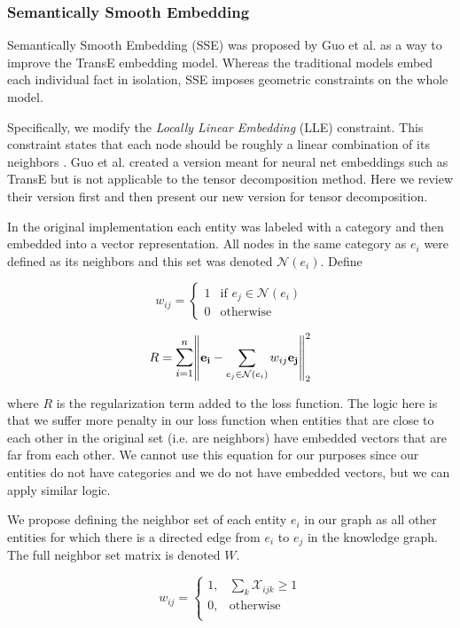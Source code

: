 \documentclass[pageno]{final_paper}
\begin{document}
\subsubsection{Semantically Smooth Embedding}
\label{Semantically Smooth Embedding}

Semantically Smooth Embedding (SSE) was proposed by Guo et al. \cite{Guo2015} as
a way to improve the TransE \cite{Bordes2013} embedding model. Whereas the
traditional models embed each individual fact in isolation, SSE imposes
geometric constraints on the whole model.

Specifically, we modify the \textit{Locally Linear Embedding} (LLE) constraint.
This constraint states that each node should be roughly a linear combination of
its neighbors \cite{Roweis2000}. Guo et al. \cite{Guo2015} created a version
meant for neural net embeddings such as TransE but is not applicable to the
tensor decomposition method. Here we review their version first and then present
our new version for tensor decomposition.

In the original implementation each entity was labeled with a category and
then embedded into a vector representation. All nodes in the same category as
$e_i$ were defined as its neighbors and this set was denoted $\mathcal{N}(e_i)$.
Define

$$
w_{ij} =
\begin{cases}
    1 & \text{if } e_j \in \mathcal{N}(e_i) \\
    0 & \text{otherwise}
\end{cases}
$$

$$R = \mathlarger{\sum_{i=1}^n} \norm{\mathbf{e_i} - \sum_{e_j \in \mathcal{N}(e_i)} w_{ij}
\mathbf{e_j}}_2^2$$

where $R$ is the regularization term added to the loss function. The logic here
is that we suffer more penalty in our loss function when entities that are close
to each other in the original set (i.e. are neighbors) have embedded vectors
that are far from each other. We cannot use this equation for our purposes since
our entities do not have categories and we do not have embedded vectors, but we
can apply similar logic.

We propose defining the neighbor set of each entity $e_i$ in our graph as all
other entities for which there is a directed edge from $e_i$ to $e_j$ in the
knowledge graph. The full neighbor set matrix is denoted $W$.

\begin{equation}
    \label{eq: new wij}
    w_{ij} =
    \begin{cases}
        1, & \sum\limits_k \mathcal{X}_{ijk} \geq 1 \\
        0, & \text{otherwise} \\
    \end{cases}
\end{equation}
\end{document}
